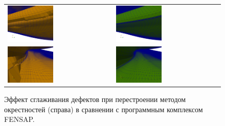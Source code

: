 \documentclass[a4paper,14pt]{extarticle}                     %
\theoremstyle{plain}                                         %
\begin{document}
\begin{figure}[!ht]
\centering
\begin{tabular}{ll}
\includegraphics[width=0.45\textwidth]{pics/text_1_remesh_3d/fens1.png}
&
\includegraphics[width=0.45\textwidth]{pics/text_1_remesh_3d/crys1.png} \\
\includegraphics[width=0.45\textwidth]{pics/text_1_remesh_3d/fens2.png}
&
\includegraphics[width=0.45\textwidth]{pics/text_1_remesh_3d/crys2.png}
\end{tabular}
\singlespacing
{}\caption{Эффект сглаживания дефектов при перестроении методом окрестностей (справа) в сравнении с программным комплексом FENSAP.}
\label{fig:text_1_remesh3_with_fensap}
\end{figure}
\end{document}
